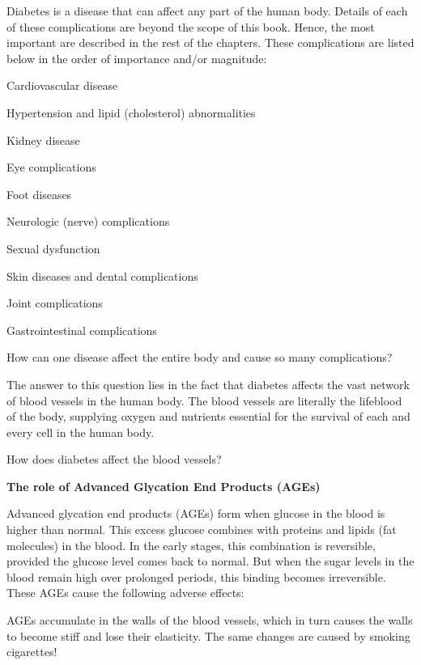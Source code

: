 Diabetes is a disease that can affect any part of the human body. Details of each of these complications are beyond the scope of this book. Hence, the most important are described in the rest of the chapters. These complications are listed below in the order of importance and/or magnitude:

\item Cardiovascular disease

 \item Hypertension and lipid (cholesterol) abnormalities

 \item Kidney disease

 \item Eye complications

 \item Foot diseases

 \item Neurologic (nerve) complications

 \item Sexual dysfunction

 \item Skin diseases and dental complications

 \item Joint complications

 \item Gastrointestinal complications

How can one disease affect the entire body and cause so many complications?

The answer to this question lies in the fact that diabetes affects the vast network of blood vessels in the human body. The blood vessels are literally the lifeblood of the body, supplying oxygen and nutrients essential for the survival of each and every cell in the human body.

How does diabetes affect the blood vessels?

\textbf{The role of Advanced Glycation End Products (AGEs)}

Advanced glycation end products (AGEs) form when glucose in the blood is higher than normal. This excess glucose combines with proteins and lipids (fat molecules) in the blood. In the early stages, this combination is reversible, provided the glucose level comes back to normal. But when the sugar levels in the blood remain high over prolonged periods, this binding becomes irreversible. These AGEs cause the following adverse effects:

\item AGEs accumulate in the walls of the blood vessels, which in turn causes the walls to become stiff and lose their elasticity. The same changes are caused by smoking cigarettes!

